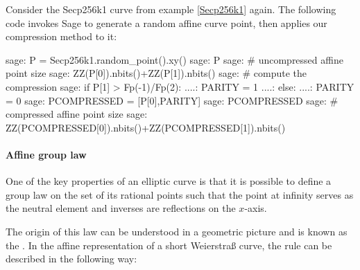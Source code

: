 \begin{example}
Consider the Secp256k1 curve from example \ref{Secp256k1} again. The following code invokes Sage to generate a random affine curve point, then applies our compression method to it:
\begin{sagecommandline}
sage: P = Secp256k1.random_point().xy()
sage: P
sage: # uncompressed affine point size
sage: ZZ(P[0]).nbits()+ZZ(P[1]).nbits()
sage: # compute the compression
sage: if P[1] > Fp(-1)/Fp(2):
....:     PARITY = 1
....: else:
....:     PARITY = 0
sage: PCOMPRESSED = [P[0],PARITY]
sage: PCOMPRESSED
sage: # compressed affine point size
sage: ZZ(PCOMPRESSED[0]).nbits()+ZZ(PCOMPRESSED[1]).nbits()
\end{sagecommandline}
\end{example}


\paragraph{Affine group law}
One of the key properties of an elliptic curve is that it is possible to define a group law on the set of its rational points such that the point at infinity serves as the neutral element and inverses are reflections on the $x$-axis.

The origin of this law can be understood in a geometric picture and is known as the . In the affine representation of a short Weierstraß curve, the rule can be described in the following way:

